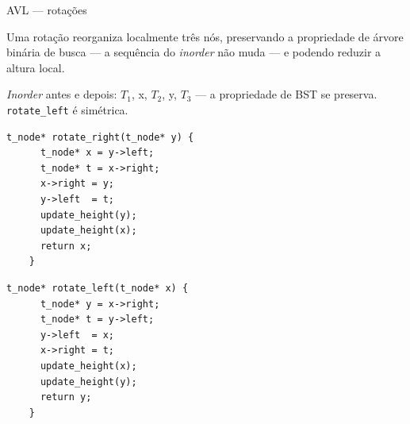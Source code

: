 \documentclass{beamer}
\begin{document}
\begin{frame}{AVL --- rotações}

  Uma rotação reorganiza localmente três nós, preservando a propriedade
  de árvore binária de busca --- a sequência do \emph{inorder} não muda
  --- e podendo reduzir a altura local.

  \framebreak

  \begin{center}
  \end{center}

  \emph{Inorder} antes e depois: $T_1$, x, $T_2$, y, $T_3$ --- a
  propriedade de BST se preserva. \texttt{rotate\_left} é simétrica.

  \framebreak

  \begin{lstlisting}[style=normalc,caption=tree.c]
    t_node* rotate_right(t_node* y) {
      t_node* x = y->left;
      t_node* t = x->right;
      x->right = y;
      y->left  = t;
      update_height(y);
      update_height(x);
      return x;
    }
  \end{lstlisting}

  \framebreak

  \begin{lstlisting}[style=normalc,caption=tree.c]
    t_node* rotate_left(t_node* x) {
      t_node* y = x->right;
      t_node* t = y->left;
      y->left  = x;
      x->right = t;
      update_height(x);
      update_height(y);
      return y;
    }
  \end{lstlisting}

\end{frame}
\end{document}
